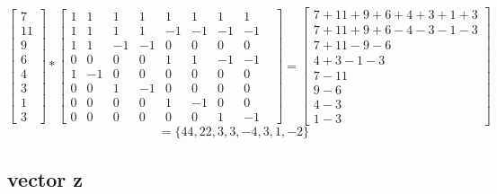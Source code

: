 \documentclass{article}
\begin{document}
\[ 
	\begin{bmatrix}
		7 \\
		11 \\
		9 \\
		6 \\
		4 \\
		3 \\
		1 \\
		3 
	\end{bmatrix}
		*  
\begin{bmatrix} 
	1&1&1&1&1&1&1&1 \\ 
	1&1&1&1&-1&-1&-1&-1 \\
	1&1&-1&-1&0&0&0&0& \\ 
	0&0&0&0&1&1&-1&-1 \\ 
	1&-1&0&0&0&0&0&0& \\
	0&0&1&-1&0&0&0&0 \\ 
	0&0&0&0&1&-1&0&0& \\ 
	0&0&0&0&0&0&1&-1 
\end{bmatrix}
=
\begin{bmatrix}
	7+11+9+6+4+3+1+3 \\
	7+11+9+6 -4 -3 -1 -3 \\
	7+11 -9-6 \\
	4+3 -1 -3 \\
	7-11 \\
	9-6 \\
	4-3 \\
	1-3

\end{bmatrix}
\]
\[
	= \{ 44, 22, 3, 3, -4, 3, 1, -2 \}
\]



\subsection{vector z}
\end{document}
